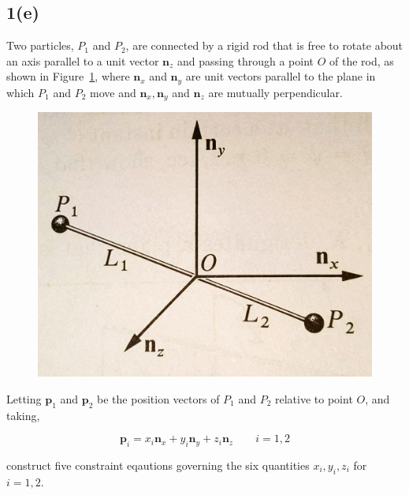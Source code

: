 \subsection{1(e)}
Two particles, $P_1$ and $P_2$, are connected by a rigid rod that is free to rotate about an axis parallel to a unit vector $\pmb n_z$ and passing through a point $O$ of the rod, as shown in Figure~\ref{1_e}, where $\pmb n_x$ and $\pmb n_y$ are unit vectors parallel to the plane in which $P_1$ and $P_2$ move and $\pmb n_x, \pmb n_y$ and $\pmb n_z$ are mutually perpendicular.

\begin{figure}[H]
    \centering
    \includegraphics[scale = 0.1]{figs/ProbSet_1/1_e.jpg}
    \caption{}
    \label{1_e}
\end{figure}

Letting $\pmb p_1$ and $\pmb p_2$ be the position vectors of $P_1$ and $P_2$ relative to point $O$, and taking,

$$\pmb p_i = x_i \pmb n_x + y_i \pmb n_y + z_i \pmb n_z \qquad i = 1, 2$$

construct five constraint eqautions governing the six quantities $x_i, y_i, z_i$ for $i=1, 2$.

